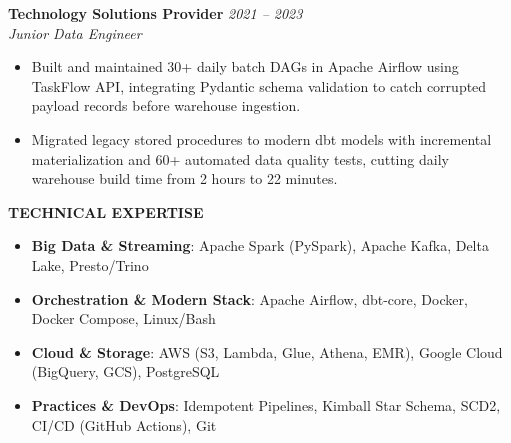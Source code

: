 \begin{samplecvbox}
\textbf{Technology Solutions Provider} \hfill \textit{2021 -- 2023}\\
\textit{Junior Data Engineer}
\begin{itemize}[leftmargin=12pt, nosep]
    \item Built and maintained 30+ daily batch DAGs in Apache Airflow using TaskFlow API, integrating Pydantic schema validation to catch corrupted payload records before warehouse ingestion.
    \item Migrated legacy stored procedures to modern dbt models with incremental materialization and 60+ automated data quality tests, cutting daily warehouse build time from 2 hours to 22 minutes.
\end{itemize}\vspace{6pt}

\textbf{\large TECHNICAL EXPERTISE}
\begin{itemize}[leftmargin=12pt, nosep]
    \item \textbf{Big Data \& Streaming}: Apache Spark (PySpark), Apache Kafka, Delta Lake, Presto/Trino
    \item \textbf{Orchestration \& Modern Stack}: Apache Airflow, dbt-core, Docker, Docker Compose, Linux/Bash
    \item \textbf{Cloud \& Storage}: AWS (S3, Lambda, Glue, Athena, EMR), Google Cloud (BigQuery, GCS), PostgreSQL
    \item \textbf{Practices \& DevOps}: Idempotent Pipelines, Kimball Star Schema, SCD2, CI/CD (GitHub Actions), Git
\end{itemize}
\end{samplecvbox}

